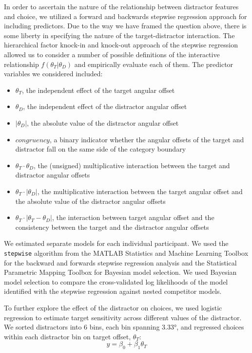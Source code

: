 \documentclass[a4paper, nobind]{templates/ociamthesis}
\providecommand{\tightlist}{%
  \setlength{\itemsep}{0pt}\setlength{\parskip}{0pt}}
\begin{document}
In order to ascertain the nature of the relationship between distractor features and choice, we utilized a forward and backwards stepwise regression approach for including predictors. Due to the way we have framed the question above, there is some liberty in specifying the nature of the target-distractor interaction. The hierarchical factor knock-in and knock-out approach of the stepwise regression allowed us to consider a number of possible definitions of the interactive relationship \(f(\theta_T|\theta_D)\) and empirically evaluate each of them. The predictor variables we considered included:

\begin{itemize}
\tightlist
\item
  \(\theta_T\), the independent effect of the target angular offset
\item
  \(\theta_D\), the independent effect of the distractor angular offset
\item
  \(|\theta_D|\), the absolute value of the distractor angular offset
\item
  \(congruency\), a binary indicator whether the angular offsets of the target and distractor fall on the same side of the category boundary
\item
  \(\theta_T \cdot \theta_D\), the (unsigned) multiplicative interaction between the target and distractor angular offsets
\item
  \(\theta_T \cdot |\theta_D|\), the multiplicative interaction between the target angular offset and the absolute value of the distractor angular offsets
\item
  \(\theta_T \cdot |\theta_T - \theta_D|\), the interaction between target angular offset and the consistency between the target and the distractor angular offsets
\end{itemize}

We estimated separate models for each individual participant. We used the \texttt{stepwise} algorithm from the MATLAB Statistics and Machine Learning Toolbox for the backward and forwards stepwise regression analysis and the Statistical Parametric Mapping Toolbox for Bayesian model selection. We used Bayesian model selection \autocite{stephan2009} to compare the cross-validated log likelihoods of the model identified with the stepwise regression against nested competitor models.

To further explore the effect of the distractor on choices, we used logistic regression to estimate target sensitivity across different values of the distractor. We sorted distractors into 6 bins, each bin spanning 3.33°, and regressed choices within each distractor bin on target offset, \(\theta_T\):
\begin{equation}
y = \beta_0 + \beta_1\theta_T
\end{equation}
\end{document}
